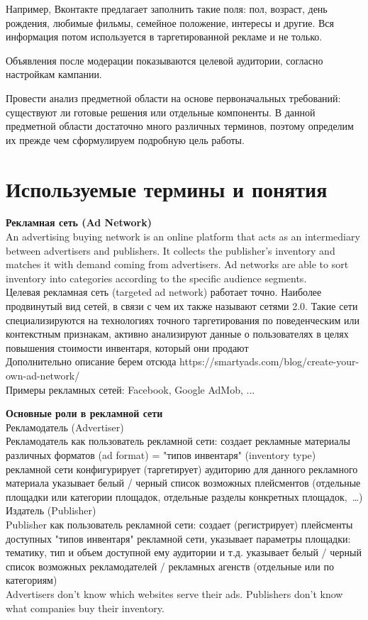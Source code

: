 \documentclass[times]{itmo-student-thesis}
\begin{document}
Например, Вконтакте предлагает заполнить такие поля: пол, возраст, день рождения, любимые фильмы, семейное положение, интересы и другие. Вся информация потом используется в таргетированной рекламе и не только.

Объявления после модерации показываются целевой аудитории, согласно настройкам кампании.

	



Провести анализ предметной области на основе первоначальных требований: существуют ли готовые решения или отдельные компоненты.
В данной предметной области достаточно много различных терминов, поэтому 
определим их прежде чем сформулируем подробную цель работы.

\section{Используемые термины и понятия}\label{sec:terms}


\textbf{Рекламная сеть (Ad Network)}
\\
An advertising buying network is an online platform that acts as an intermediary between advertisers and publishers. It collects the publisher's inventory and matches it with demand coming from advertisers. Ad networks are able to sort inventory into categories according to the specific audience segments.
\\
Целевая рекламная сеть (targeted ad network) работает точно. Наиболее продвинутый вид сетей, в связи с чем их также называют сетями 2.0. Такие сети специализируются на технологиях точного таргетирования по поведенческим или контекстным признакам, активно анализируют данные о пользователях в целях повышения стоимости инвентаря, который они продают
\\
Дополнительно описание берем отсюда https://smartyads.com/blog/create-your-own-ad-network/
\\
Примеры рекламных сетей: Facebook, Google AdMob, ...


\textbf{Основные роли в рекламной сети}
\\
Рекламодатель (Advertiser)
\\
Рекламодатель как пользователь рекламной сети:
создает рекламные материалы различных форматов (ad format) = "типов инвентаря" (inventory type) рекламной сети
конфигурирует (таргетирует) аудиторию для данного рекламного материала
указывает белый / черный список возможных плейсментов (отдельные площадки или категории площадок, отдельные разделы конкретных площадок, …)
\\
Издатель (Publisher)
\\
Publisher как пользователь рекламной сети:
создает (регистрирует) плейсменты доступных "типов инвентаря" рекламной сети, указывает параметры площадки: тематику, тип и объем доступной ему аудитории и т.д.
указывает белый / черный список возможных рекламодателей / рекламных агенств (отдельные или по категориям)
\\
Advertisers don't know which websites serve their ads. Publishers don't know what companies buy their inventory.
\end{document}
